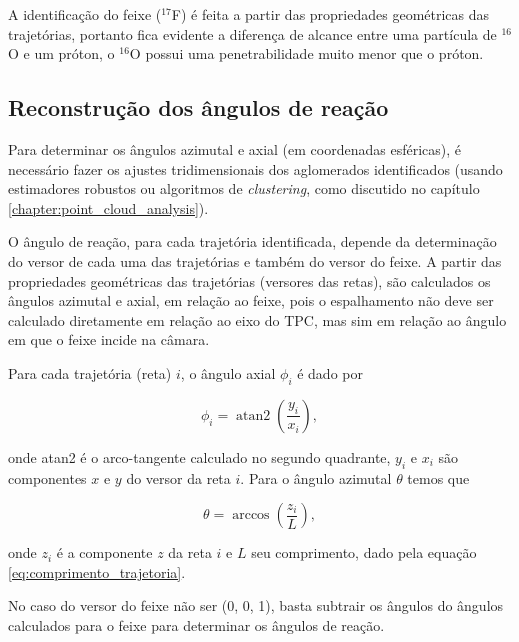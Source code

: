 \documentclass[a4paper,12pt,oneside]{book}
\DeclareMathOperator{\atantwo}{atan2}
\begin{document}
\par A identificação do feixe ($^{17}$F) é feita a partir das propriedades geométricas das trajetórias, portanto fica evidente a diferença de alcance entre uma partícula de $^{16}$O e um próton, o $^{16}$O possui uma penetrabilidade muito menor que o próton.

\subsection{Reconstrução dos ângulos de reação}

\par Para determinar os ângulos azimutal e axial (em coordenadas esféricas), é necessário fazer os ajustes tridimensionais dos aglomerados identificados (usando estimadores robustos ou algoritmos de \textit{clustering}, como discutido no capítulo \ref{chapter:point_cloud_analysis}).

\par O ângulo de reação, para cada trajetória identificada, depende da determinação do versor de cada uma das trajetórias e também do versor do feixe. A partir das propriedades geométricas das trajetórias (versores das retas), são calculados os ângulos azimutal e axial, em relação ao feixe, pois o espalhamento não deve ser calculado diretamente em relação ao eixo do TPC, mas sim em relação ao ângulo em que o feixe incide na câmara.

\par Para cada trajetória (reta) $i$, o ângulo axial $\phi_i$ é dado por

\begin{equation}
	\phi_i = \atantwo \left (\frac{y_i}{x_i} \right),
\end{equation}

\par onde atan2 é o arco-tangente calculado no segundo quadrante, $y_i$ e $x_i$ são componentes $x$ e $y$ do versor da reta $i$. Para o ângulo azimutal $\theta$ temos que

\begin{equation}
	\theta = \arccos \left (\frac{z_i}{L} \right),
\end{equation}

\par onde $z_i$ é a componente $z$ da reta $i$ e $L$ seu comprimento, dado pela equação \ref{eq:comprimento_trajetoria}.

\par No caso do versor do feixe não ser (0, 0, 1), basta subtrair os ângulos do ângulos calculados para o feixe para determinar os ângulos de reação.
\end{document}
